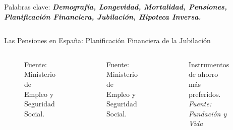 \documentclass[]{beamer}
\begin{document}
\begin{frame}{\vspace{1ex}\hfill Palabras clave: \bfseries \textit{Demograf\'ia, Longevidad, Mortalidad, Pensiones, Planificaci\'on Financiera, Jubilaci\'on, Hipoteca Inversa.}}
\begin{columns}[t]
\begin{block}{Las Pensiones en Espa\~na: Planificaci\'on Financiera de la Jubilaci\'on}
\begin{columns}[t]
\begin{figure}[h]
						\caption{\small Fuente: Ministerio de Empleo y Seguridad Social.}
						\label{pension2}
					\end{figure}\vspace{-2cm}
					\begin{figure}[h]
						\caption{\small Fuente: Ministerio de Empleo y Seguridad Social.}
						\label{reval}
					\end{figure}
					\begin{figure}[h]
						\caption{\small Instrumentos de ahorro m\'as preferidos. \textit{Fuente: Fundaci\'on y Vida}}
						\label{ahorro2}
					\end{figure}\vspace{-0.5cm}
					\begin{figure}[h]

\end{figure}
\end{columns}
\end{block}
\end{columns}
\end{frame}
\end{document}
